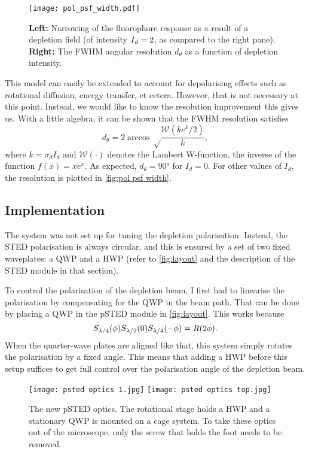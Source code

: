 \begin{figure}
	\centering
	\texttt{[image: pol\_psf\_width.pdf]}
	\caption{
		\textbf{Left:} Narrowing of the fluorophore response as a result of a depletion field (of intensity $ I_{\mathit{d}}=2 $, as compared to the right pane). \textbf{Right:} The FWHM angular resolution $ d_\theta $ as a function of depletion intensity.
	}
	\label{fig:pol psf width}
\end{figure}

This model can easily be extended to account for depolarising effects such as rotational diffusion, energy transfer, et cetera. However, that is not necessary at this point. Instead, we would like to know the resolution improvement this gives us. With a little algebra, it can be shown that the FWHM resolution satisfies
\begin{equation}
	d_\theta = 2\arccos\sqrt\frac{\mathcal{W}(k e^{k}/2)}{k},
\end{equation}
where $ k = \sigma_dI_d $ and $ \mathcal{W}(\cdot) $ denotes the Lambert W-function, the inverse of the function $ f(x) = xe^x $. As expected, $ d_\theta=\ang{90} $ for $ I_d=0 $. For other values of $ I_d $, the resolution is plotted in \autoref{fig:pol psf width}.


\subsection{Implementation}
\label{sec:psted implementation}

The system was not set up for tuning the depletion polarisation. Instead, the STED polarisation is always circular, and this is ensured by a set of two fixed waveplates: a QWP and a HWP (refer to \autoref{fig:layout} and the description of the STED module in that section). 

To control the polarisation of the depletion beam, I first had to linearise the polarisation by compensating for the QWP in the beam path. That can be done by placing a QWP in the pSTED module in \autoref{fig:layout}. This works because 
\begin{equation}
	S_{\lambda/4}(\phi)S_{\lambda/2}(0)S_{\lambda/4}(-\phi) = R(2\phi).
\end{equation}
When the quarter-wave plates are aligned like that, this system simply rotates the polarisation by a fixed angle. This means that adding a HWP before this setup suffices to get full control over the polarisation angle of the depletion beam.

\begin{figure}
	\centering
	\texttt{[image: psted optics 1.jpg]}%
	\hfill%
	\texttt{[image: psted optics top.jpg]}
	\caption{
		The new pSTED optics. The rotational stage holds a HWP and a stationary QWP is mounted on a cage system. To take these optics out of the microscope, only the screw that holds the foot needs to be removed.
	}
	\label{fig:psted optics photo}
\end{figure}

